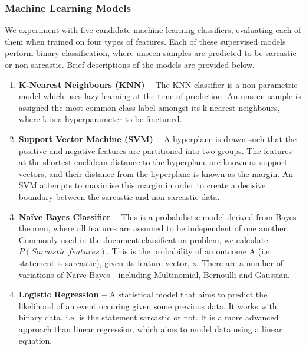 \documentclass[12pt,a4paper]{article}
\begin{document}
\subsubsection{Machine Learning Models}
We experiment with five candidate machine learning classifiers, evaluating each of them when trained on four types of features. Each of these supervised models perform binary classification, where unseen samples are predicted to be sarcastic or non-sarcastic. Brief descriptions of the models are provided below. 

\begin{enumerate}[leftmargin=0cm]
	\item \textbf{K-Nearest Neighbours (KNN) --} The KNN classifier is a non-parametric model which uses lazy learning at the time of prediction. An unseen sample is assigned the most common class label amongst its k nearest neighbours, where k is a hyperparameter to be finetuned.
	
	
	\item \textbf{Support Vector Machine (SVM) --} A hyperplane is drawn such that the positive and negative features are partitioned into two groups. The features at the shortest euclidean distance to the hyperplane are known as support vectors, and their distance from the hyperplane is known as the margin. An SVM attempts to maximise this margin in order to create a decisive boundary between the sarcastic and non-sarcastic data.
	
	\item \textbf{Na\"{i}ve Bayes Classifier --} This is a probabilistic model derived from Bayes theorem, where all features are assumed to be independent of one another. Commonly used in the document classification problem, we calculate ${P(Sarcastic | features)}$. This is  the probability of an outcome A (i.e. statement is sarcastic), given its feature vector, x. There are a number of variations of Na\"{i}ve Bayes - including Multinomial, Bernoulli and Gaussian. 

	\item \textbf{Logistic Regression --} A statistical model that aims to predict the likelihood of an event occuring given some previous data. It works with binary data, i.e. is the statement sarcastic or not. It is a more advanced approach than linear regression, which aims to model data using a linear equation.


\end{enumerate}
\end{document}
